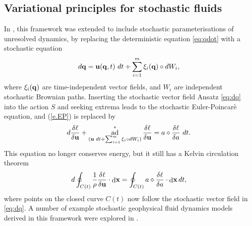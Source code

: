 \documentclass[12pt,onesided]{article}
\def\MM#1{{\bf{#1}}}
\DeclareMathOperator{\ad}{ad}
\DeclareMathOperator{\diff}{d}
\newcommand{\difft}{d}
\begin{document}
\subsection{Variational principles for stochastic fluids}
In \cite{Holm15,CrFlHo2017}, this framework was extended to include stochastic
parameterisations of unresolved dynamics, by replacing the deterministic
equation \eqref{eq:qdot} with a stochastic equation
\begin{equation}
  \label{eq:dq}
  \difft \MM{q} = \MM{u}(\MM{q},t)\,{{\,\difft t}} + \sum_{i=1}^m \MM{\xi}_i(\MM{q})\circ {\difft W_i},
\end{equation}
where $\MM{\xi}_i(\MM{q})$ are time-independent vector fields, and $W_i$ are
independent stochastic Brownian paths. Inserting the stochastic vector field Ansatz \eqref{eq:dq} into the action $S$
and seeking extrema leads to the stochastic Euler-Poincar\`e equation, and (\ref{e.EP}) is replaced by
\begin{equation}
{\difft}\frac{\delta \ell}{\delta \MM{u}} + \ad^*_{(\MM{u} \,{{\,\difft t}} + \sum_{i=1}^m {\bf
    \MM{\xi}}_i\circ {\difft W_i})}\frac{\delta \ell}{\delta \MM{u}} =
a\diamond \frac{\delta \ell}{\delta a}\,{{\,\difft t}}.
\end{equation}
This equation no longer conserves energy, but it still has a Kelvin circulation
theorem
\begin{equation}
  {\difft} \oint_{C(t)} \frac{1}{\rho}\frac{\delta \ell}{\delta
    \MM{u}}\cdot{\diff} \MM{x} = \oint_{C(t)} a\diamond \frac{\delta \ell}{\delta a}\cdot{\diff} \MM{x} \,{\difft} t,
\end{equation}
where points on the closed curve $C(t)$ now follow the stochastic
vector field in \eqref{eq:dq}. A number of example stochastic geophysical
fluid dynamics models derived in this framework were explored in
\cite{Holm15}.
\end{document}
